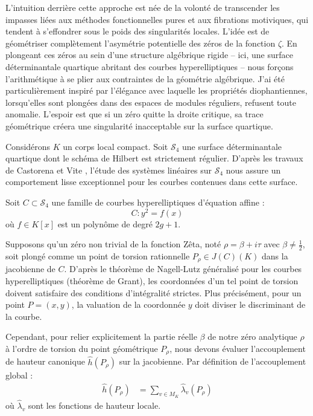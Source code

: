 \documentclass[
]{article}
\begin{document}
L'intuition derrière cette approche est née de la volonté de transcender les impasses liées aux méthodes fonctionnelles pures et aux fibrations motiviques, qui tendent à s'effondrer sous le poids des singularités locales. L'idée est de géométriser complètement l'asymétrie potentielle des zéros de la fonction $\zeta$. En plongeant ces zéros au sein d'une structure algébrique rigide -- ici, une surface déterminantale quartique abritant des courbes hyperelliptiques -- nous forçons l'arithmétique à se plier aux contraintes de la géométrie algébrique. J'ai été particulièrement inspiré par l'élégance avec laquelle les propriétés diophantiennes, lorsqu'elles sont plongées dans des espaces de modules réguliers, refusent toute anomalie. L'espoir est que si un zéro quitte la droite critique, sa trace géométrique créera une singularité inacceptable sur la surface quartique.

Considérons $K$ un corps local compact. Soit $\mathcal{S}_4$ une surface déterminantale quartique dont le schéma de Hilbert est strictement régulier. D'après les travaux de Castorena et Vite \cite{castorena2026curves}, l'étude des systèmes linéaires sur $\mathcal{S}_4$ nous assure un comportement lisse exceptionnel pour les courbes contenues dans cette surface.

Soit $C \subset \mathcal{S}_4$ une famille de courbes hyperelliptiques d'équation affine :
\begin{equation*}
C : y^2 = f(x)
\end{equation*}
où $f \in K[x]$ est un polynôme de degré $2g+1$.

Supposons qu'un zéro non trivial de la fonction Zêta, noté $\rho = \beta + i\tau$ avec $\beta \neq \frac{1}{2}$, soit plongé comme un point de torsion rationnelle $P_\rho \in J(C)(K)$ dans la jacobienne de $C$.
D'après le théorème de Nagell-Lutz généralisé pour les courbes hyperelliptiques (théorème de Grant), les coordonnées d'un tel point de torsion doivent satisfaire des conditions d'intégralité strictes. Plus précisément, pour un point $P = (x, y)$, la valuation de la coordonnée $y$ doit diviser le discriminant de la courbe.

Cependant, pour relier explicitement la partie réelle $\beta$ de notre zéro analytique $\rho$ à l'ordre de torsion du point géométrique $P_\rho$, nous devons évaluer l'accouplement de hauteur canonique $\hat{h}(P_\rho)$ sur la jacobienne. Par définition de l'accouplement global :
\begin{align*}
\hat{h}(P_\rho) &= \sum_{v \in M_K} \hat{\lambda}_v(P_\rho)
\end{align*}
où $\hat{\lambda}_v$ sont les fonctions de hauteur locale.
\end{document}
